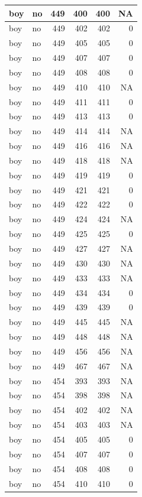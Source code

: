 \documentclass[man]{apa6}
\begin{document}
\begin{tabular}{l|l|r|r|r|r}
\hline
boy & no & 449 & 400 & 400 & NA\\
\hline
boy & no & 449 & 402 & 402 & 0\\
\hline
boy & no & 449 & 405 & 405 & 0\\
\hline
boy & no & 449 & 407 & 407 & 0\\
\hline
boy & no & 449 & 408 & 408 & 0\\
\hline
boy & no & 449 & 410 & 410 & NA\\
\hline
boy & no & 449 & 411 & 411 & 0\\
\hline
boy & no & 449 & 413 & 413 & 0\\
\hline
boy & no & 449 & 414 & 414 & NA\\
\hline
boy & no & 449 & 416 & 416 & NA\\
\hline
boy & no & 449 & 418 & 418 & NA\\
\hline
boy & no & 449 & 419 & 419 & 0\\
\hline
boy & no & 449 & 421 & 421 & 0\\
\hline
boy & no & 449 & 422 & 422 & 0\\
\hline
boy & no & 449 & 424 & 424 & NA\\
\hline
boy & no & 449 & 425 & 425 & 0\\
\hline
boy & no & 449 & 427 & 427 & NA\\
\hline
boy & no & 449 & 430 & 430 & NA\\
\hline
boy & no & 449 & 433 & 433 & NA\\
\hline
boy & no & 449 & 434 & 434 & 0\\
\hline
boy & no & 449 & 439 & 439 & 0\\
\hline
boy & no & 449 & 445 & 445 & NA\\
\hline
boy & no & 449 & 448 & 448 & NA\\
\hline
boy & no & 449 & 456 & 456 & NA\\
\hline
boy & no & 449 & 467 & 467 & NA\\
\hline
boy & no & 454 & 393 & 393 & NA\\
\hline
boy & no & 454 & 398 & 398 & NA\\
\hline
boy & no & 454 & 402 & 402 & NA\\
\hline
boy & no & 454 & 403 & 403 & NA\\
\hline
boy & no & 454 & 405 & 405 & 0\\
\hline
boy & no & 454 & 407 & 407 & 0\\
\hline
boy & no & 454 & 408 & 408 & 0\\
\hline
boy & no & 454 & 410 & 410 & 0\\

\end{tabular}
\end{document}

